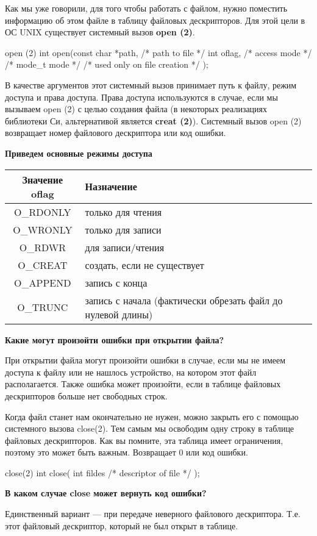 Как мы уже говорили, для того чтобы работать с файлом, нужно поместить информацию об этом файле в таблицу файловых дескрипторов. Для этой цели в ОС UNIX существует системный вызов \textbf{open (2)}. 

\begin{CCode}{open (2)}
	int open(const char *path,		/* path to file */ 
		int oflag,					/* access mode */
		/* mode_t mode */			/* used only on file creation */
	); \end{CCode}

В качестве аргументов этот системный вызов принимает путь к файлу, режим доступа и права доступа. Права доступа используются в случае, если мы вызываем open (2) с целью создания файла (в некоторых реализациях библиотеки Си, альтернативой является \textbf{creat (2)}). 
Системный вызов open (2) возвращает номер файлового дескриптора или код ошибки.

\textbf{Приведем основные режимы доступа}

\begin{center}
	\begin{tabular}{c|l}
		\textbf{Значение oflag} & \textbf{Назначение} \\
		\hline
		O\_RDONLY	&	только для чтения \\
		\hline
		O\_WRONLY	&	только для записи \\
		\hline
		O\_RDWR		&	для записи/чтения \\
		\hline
		O\_CREAT	&	создать, если не существует \\
		\hline
		O\_APPEND	&	запись с конца \\
		\hline 
		O\_TRUNC	&	запись с начала (фактически обрезать файл до нулевой длины)
	\end{tabular}
\end{center}

\textbf{Какие могут произойти ошибки при открытии файла?}

При открытии файла могут произойти ошибки в случае, если мы не имеем доступа к файлу или не нашлось устройство, на котором этот файл располагается. Также ошибка может произойти, если в таблице файловых дескрипторов больше нет свободных строк.

Когда файл станет нам окончательно не нужен, можно закрыть его с помощью системного вызова close(2). Тем самым мы освободим одну строку в таблице файловых дескрипторов. Как вы помните, эта таблица имеет ограничения, поэтому это может быть важным. Возвращает 0 или код ошибки.

\begin{CCode}{close(2)}
	int close( 
		int fildes /* descriptor of file */ 
	); \end{CCode}
	
\textbf{В каком случае close может вернуть код ошибки?}

Единственный вариант --- при передаче неверного файлового дескриптора. Т.е. этот файловый дескриптор, который не был открыт в таблице.
